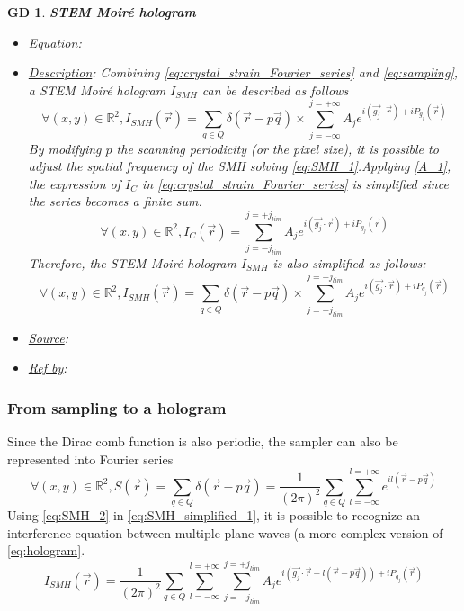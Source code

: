 \documentclass[12pt]{article}
\newtheorem{GD}{GD}
\begin{document}
\begin{GD}
\normalfont \textbf{STEM Moir{\'e} hologram}
\begin{itemize}
\item \underline{Equation}: 
\item \underline{Description}: Combining \cref{eq:crystal_strain_Fourier_series} and \cref{eq:sampling}, a STEM Moir{\'e} hologram $I_{SMH}$ can be described as follows
\begin{equation}
\forall (x,y) \in \mathbb{R}^{2}, I_{SMH}(\vec{r})=\sum_{q\in Q}\delta(\vec{r}-p\vec{q})\times\sum_{j=-\infty}^{j=+\infty}A_je^{i(\vec{g_j}\cdot\vec{r})+iP_{g_{j}}(\vec{r})}
\label{eq:SMH_1}
\end{equation}
By modifying $p$ the scanning periodicity (or the pixel size), it is possible to adjust the spatial frequency of the SMH solving \cref{eq:SMH_1}.Applying \cref{A_1}, the expression of $I_C$ in \cref{eq:crystal_strain_Fourier_series} is simplified since the series becomes a finite sum.
\begin{equation}
\forall (x,y) \in \mathbb{R}^{2},I_C(\vec{r})=\sum_{j=-j_{lim}}^{j=+j_{lim}}A_je^{i(\vec{g_j}\cdot\vec{r})+iP_{g_{j}}(\vec{r})}
\label{eq:crystal_lattice_simplified}
\end{equation}
Therefore, the STEM Moir{\'e} hologram $I_{SMH}$ is also simplified as follows:
\begin{equation}
\forall (x,y) \in \mathbb{R}^{2}, I_{SMH}(\vec{r})=\sum_{q\in Q}\delta(\vec{r}-p\vec{q})\times\sum_{j=-j_{lim}}^{j=+j_{lim}}A_je^{i(\vec{g_j}\cdot\vec{r})+iP_{g_{j}}(\vec{r})}
\label{eq:SMH_simplified_1}
\end{equation}
\item \underline{Source}:
\item \underline{Ref by}:
\end{itemize}
\label{GD_2}
\end{GD}

\subsubsection*{From sampling to a hologram}

Since the Dirac comb function is also periodic, the sampler can also be represented into Fourier series
\begin{equation}
\forall (x,y) \in \mathbb{R}^{2}, S(\vec{r})=\sum_{q\in Q}\delta(\vec{r}-p\vec{q}) = \frac{1}{(2\pi)^2}\sum_{q\in Q}\sum_{l=-\infty}^{l=+\infty}e^{il(\vec{r}-p\vec{q})}
\label{eq:SMH_2}
\end{equation}
Using \cref{eq:SMH_2} in \cref{eq:SMH_simplified_1}, it is possible to recognize an interference equation between multiple plane waves (a more complex version of \cref{eq:hologram}.
\begin{equation}
I_{SMH}(\vec{r})=\frac{1}{(2\pi)^2}\sum_{q\in Q}\sum_{l=-\infty}^{l=+\infty}\sum_{j=-j_{lim}}^{j=+j_{lim}}A_je^{i(\vec{g_j}\cdot\vec{r}+l(\vec{r}-p\vec{q}))+iP_{g_{j}}(\vec{r})}
\label{eq:SMH_3}
\end{equation}
\end{document}
